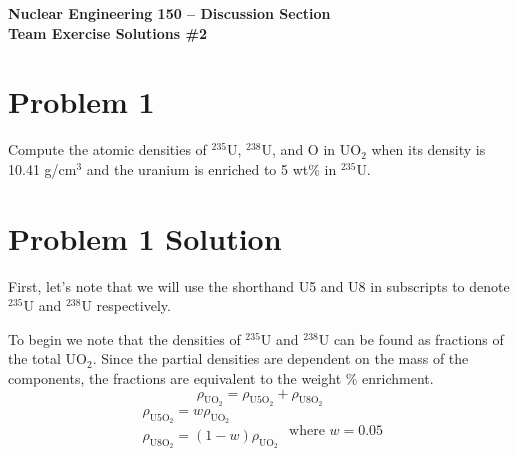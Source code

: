 \documentclass{report}
\newif\ifeqns
\begin{document}
\begin{center}
\textbf{\large Nuclear Engineering 150 -- Discussion Section}\\ 
\textbf{Team Exercise Solutions \#2}
\end{center}

\section*{Problem 1}

Compute the atomic densities of $^{235}$U, $^{238}$U, and O in UO$_2$ when its density is 10.41 g/cm$^3$ and the uranium is enriched to 5 wt\% in $^{235}$U.



\section*{Problem 1 Solution}

\ifeqns
First, let's note that we will use the shorthand U5 and U8 in subscripts to denote $^{235}$U and $^{238}$U respectively. 

To begin we note that the densities of $^{235}$U and $^{238}$U can be found as fractions of the total UO$_2$. Since the partial densities are dependent on the mass of the components, the fractions are equivalent to the weight \% enrichment.
$$ \rho_{\text{UO}_2} = \rho_{\text{U5O}_2} + \rho_{\text{U8O}_2}$$
$$ \begin{array}{lr}
        \rho_{\text{U5O}_2} = w\rho_{\text{UO}_2}    \\
        \rho_{\text{U8O}_2} = (1-w)\rho_{\text{UO}_2}\\
        \end{array} \text{ where } w = 0.05 $$
        
\end{document}
